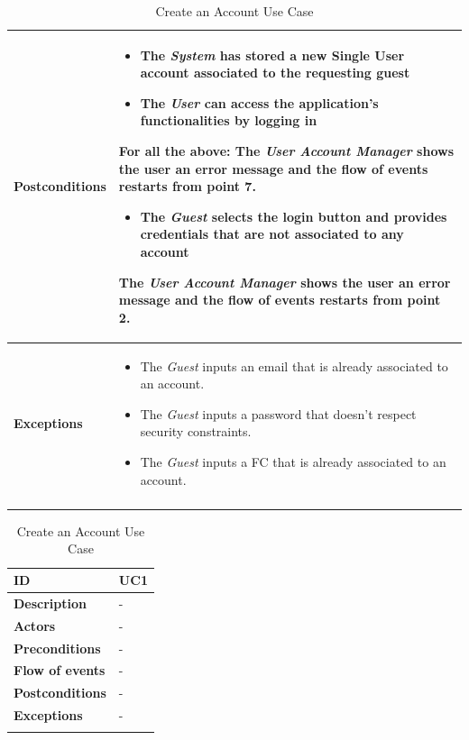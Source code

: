 \documentclass[titlepage]{article}
\begin{document}
\begin{longtable}{| p{3 cm} | p{10 cm} |}
			 \\
			\hline
			{\bf Postconditions} & 
							\begin{itemize}
								\item The {\it System} has stored a new Single User account associated to the 										requesting guest
								\item The {\it User} can access the application’s functionalities by logging in
							\end{itemize}
							For all the above: The {\it User Account Manager} shows the user an error message and the 	flow of events restarts from point 7.
							\begin{itemize}
								\item The {\it Guest}  selects the login button and provides credentials that are not 									associated to any account
							\end{itemize}
							The {\it User Account Manager }shows the user an error message and the flow of events 							restarts from point 2.
			\\
			\hline
			{\bf Exceptions} & 
							\begin{itemize}
								\item The {\it Guest} inputs an email that is already associated to an account. 
								\item The {\it Guest} inputs a password that doesn’t respect security constraints. 								\item The 	{\it Guest} inputs a FC that is already associated to an account. 
							\end{itemize} 
							
			\\
			\hline
			\caption{Create an Account Use Case}
			\end{longtable}
			
					
			\begin{longtable}{| p{3 cm} | p{10 cm} |} \hline
				{\bf ID} & UC1 \\\hline
				{\bf Description} & - \\ \hline
				{\bf Actors} & - \\ \hline
				{\bf Preconditions} & - \\ \hline
				{\bf Flow of events} & - \\ \hline
				{\bf Postconditions} & - \\ \hline
				{\bf Exceptions} & - \\ \hline
				\caption{Create an Account Use Case}			
			\end{longtable}
		
\end{document}
